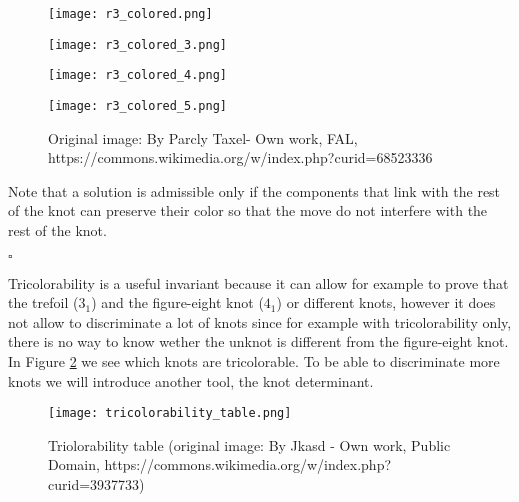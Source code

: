 \documentclass[12pt, a4paper]{article}
\newenvironment{proof}{{\sc Proof:}}{\hfill $\square$}
\begin{document}
\begin{proof}
\begin{itemize}
\begin{figure}[H]
\begin{minipage}[c]{.3\textwidth}
  \end{minipage}
  \begin{minipage}[c]{.3\textwidth}
             \centering
            \texttt{[image: r3\_colored.png]}
    
  \end{minipage}
  \begin{minipage}[c]{.3\textwidth}
             \centering
            \texttt{[image: r3\_colored\_3.png]}
    
  \end{minipage}
  \begin{minipage}[c]{.5\textwidth}
             \centering
            \texttt{[image: r3\_colored\_4.png]}
    
  \end{minipage}
  \begin{minipage}[c]{.5\textwidth}
             \centering
            \texttt{[image: r3\_colored\_5.png]}
    
  \end{minipage}
          \caption{Original image: By Parcly Taxel- Own work, FAL, https://commons.wikimedia.org/w/index.php?curid=68523336}
        \label{fig:r_3_colored}
\end{figure}
\end{itemize}

Note that a solution is admissible only if the components that link with the rest of the knot can preserve their color so that the move do not interfere with the rest of the knot.

\end{proof}

Tricolorability is a useful invariant because it can allow for example to prove that the trefoil ($3_1$) and the figure-eight knot ($4_1$) or different knots, however it does not allow to discriminate a lot of knots since for example with tricolorability only, there is no way to know wether the unknot is different from the figure-eight knot. In Figure \ref{fig:tricolor_table} we see which knots are tricolorable. To be able to discriminate more knots we will introduce another tool, the knot determinant. 

\begin{figure}[H]
  \centering
  \texttt{[image: tricolorability\_table.png]}
  \caption{Triolorability table (original image: By Jkasd - Own work, Public Domain, https://commons.wikimedia.org/w/index.php?curid=3937733)}
  \label{fig:tricolor_table}
\end{figure}
\end{document}

